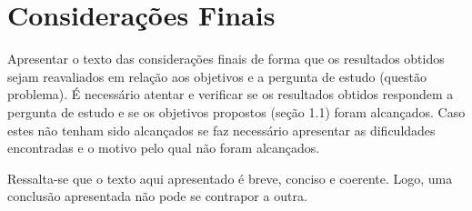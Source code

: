 \section{Considerações Finais}

Apresentar o texto das considerações finais de forma que os resultados obtidos sejam reavaliados em relação aos objetivos e a pergunta de estudo (questão problema). É necessário atentar e verificar se os resultados obtidos respondem a pergunta de estudo e se os objetivos propostos (seção 1.1) foram alcançados. Caso estes não tenham sido alcançados se faz necessário apresentar as dificuldades encontradas e o motivo pelo qual não foram alcançados.

Ressalta-se que o texto aqui apresentado é breve, conciso e coerente. Logo, uma conclusão apresentada não pode se contrapor a outra.